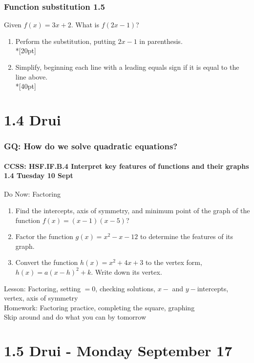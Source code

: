 \documentclass{beamer}
\begin{document}
\frame
{
  \frametitle{Function substitution  \alert{1.5}}
  Given $f(x)=3x+2$. What is $f(2x-1)$? \bigskip
    \begin{enumerate}
        \item Perform the substitution, putting $2x-1$ in parenthesis.\\*[20pt]
        \item Simplify, beginning each line with a leading equals sign if it is equal to the line above.\\*[40pt]
  \end{enumerate}
  }

  \section{1.4 Drui}
  \frame
  {
    \frametitle{GQ: How do we solve quadratic equations?}
    \framesubtitle{CCSS: HSF.IF.B.4 Interpret key features of functions and their graphs \hfill \alert{1.4 Tuesday 10 Sept}}

    \begin{block}{Do Now: Factoring}
    \begin{enumerate}
      \item Find the intercepts, axis of symmetry, and minimum point of the graph of the function $f(x)=(x-1)(x-5)$?
      \item Factor the function $g(x)=x^2-x-12$ to determine the features of its graph.
      \item Convert the function $h(x)=x^2+4x+3$ to the vertex form, $h(x)=a(x-h)^2+k$. Write down its vertex.
    \end{enumerate}
    \end{block}
    Lesson: Factoring, setting $=0$, checking solutions, $x-$ and $y-$intercepts, vertex, axis of symmetry
    \\ \bigskip
    Homework: Factoring practice, completing the square, graphing\\
    Skip around and do what you can by tomorrow
  }

  \section{1.5 Drui - Monday September 17}
\end{document}
